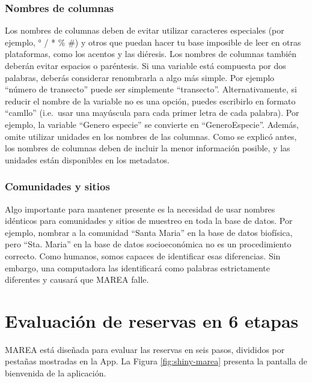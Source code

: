 \documentclass[]{krantz}
\begin{document}
\hypertarget{nombres-de-columnas}{%
\subsubsection{Nombres de columnas}\label{nombres-de-columnas}}

Los nombres de columnas deben de evitar utilizar caracteres especiales
(por ejemplo, ° / * \% \#) y otros que puedan hacer tu base imposible de
leer en otras plataformas, como los acentos y las diéresis. Los nombres
de columnas también deberán evitar espacios o paréntesis. Si una
variable está compuesta por dos palabras, deberás considerar renombrarla
a algo más simple. Por ejemplo ``número de transecto'' puede ser
simplemente ``transecto''. Alternativamente, si reducir el nombre de la
variable no es una opción, puedes escribirlo en formato ``camllo''
(i.e.~usar una mayúscula para cada primer letra de cada palabra). Por
ejemplo, la variable ``Genero especie'' se convierte en
``GeneroEspecie''. Además, omite utilizar unidades en los nombres de las
columnas. Como se explicó antes, los nombres de columnas deben de
incluir la menor información posible, y las unidades están disponibles
en los metadatos.

\hypertarget{comunidades-y-sitios}{%
\subsubsection{Comunidades y sitios}\label{comunidades-y-sitios}}

Algo importante para mantener presente es la necesidad de usar nombres
idénticos para comunidades y sitios de muestreo en toda la base de
datos. Por ejemplo, nombrar a la comunidad ``Santa Maria'' en la base de
datos biofísica, pero ``Sta. Maria'' en la base de datos socioeconómica
no es un procedimiento correcto. Como humanos, somos capaces de
identificar esas diferencias. Sin embargo, una computadora las
identificará como palabras estrictamente diferentes y causará que MAREA
falle.

\hypertarget{evaluacion-de-reservas-en-6-etapas}{%
\section{Evaluación de reservas en 6
etapas}\label{evaluacion-de-reservas-en-6-etapas}}

MAREA está diseñada para evaluar las reservas en seis pasos, divididos
por pestañas mostradas en la App. La Figura \ref{fig:shiny-marea}
presenta la pantalla de bienvenida de la aplicación.
\end{document}

